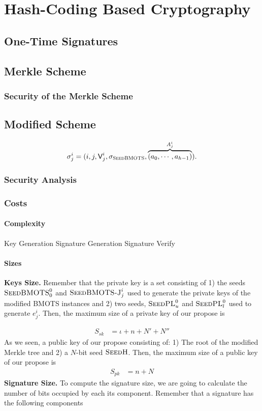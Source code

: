 \chapter{{Hash-Coding Based Cryptography}}
\section{One-Time Signatures}
\section{Merkle Scheme}
\subsection{Security of the Merkle Scheme}

\section{Modified Scheme}
\label{sec:modified_scheme}
\[
	\sigma_{j}^i=(i,j,\normalfont\textsf{V}_j^i,\sigma_{\textsc{SeedBMOTS}},\overbrace{(a_0,\cdots,a_{h-1})}^{A_j^i}).
\]

\subsection{Security Analysis}
\subsection{Costs}
\subsubsection{Complexity}
Key Generation
Signature Generation
Signature Verify


\subsubsection{Sizes}

\textbf{Keys Size.}
Remember that the private key is a set consisting of 
1) the seeds $\textsc{SeedBMOTS}^0_0$ and $\textsc{SeedBMOTS-J}_j^i$ used to generate the private keys of the modified BMOTS instances and 2) two seeds, $\textsc{SeedPL}^0_u$ and $\textsc{SeedPL}^0_l$ used to generate $e^i_j$. Then, the maximum size of a private key of our propose is

\begin{equation}
\begin{split}
    S_{sk} &= \iota + n + N' + N''
\end{split}
\end{equation}
As we seen, a public key of our propose consisting of: 1) The root of the modified Merkle tree and 2) a $N$-bit seed $\textsc{SeedH}$. Then, the maximum size of a public key of our propose is
\begin{equation}
\begin{split}
    S_{pk} &= n + N
\end{split}
\end{equation}
\textbf{Signature Size.} To compute the signature size, we are going to calculate the number of bits occupied by each its component. Remember that a signature has the following components

